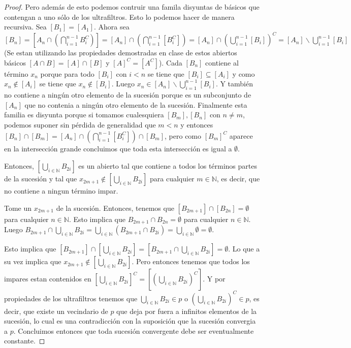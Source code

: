 \documentclass[letter,twoside,12pt]{article}
\begin{document}
\begin{enumerate}
\begin{proof}
Pero además de esto podemos contruir una famila disyuntas de básicos que contengan a uno sólo de los ultrafiltros. Esto lo podemos hacer de manera recursiva. Sea $ [B_1] = [A_1] $. Ahora sea $ [B_n] = [A_n\cap(\bigcap_{i=1}^{n-1} B_{i}^C)] = [A_n]\cap(\bigcap_{i=1}^{n-1} [B_{i}^C]) = [A_n]\cap (\bigcup_{i=1}^{n-1} [B_{i}])^C = [A_n] \backslash \bigcup_{i=1}^{n-1} [ B_{i}]$ (Se estan utilizando las propiedades demostradas en clase de estos abiertos básicos $ [A \cap B]= [A]\cap[B] $ y $ [A]^C =[A^C]$). Cada $ [B_n] $ contiene al término $ x_n $ porque para todo $ [B_i] $ con $ i < n $ se tiene que $ [B_i]\subseteq [A_i] $ y como $ x_n \not \in [A_i] $ se tiene que $ x_n \not  \in [B_i] $. Luego $ x_n \in [A_n] \backslash \bigcup_{i=1}^{n-1} [ B_{i}] $. Y también no contiene a ningún otro elemento de la sucesión porque es un subconjunto de $ [A_n] $ que no contenia a ningún otro elemento de la sucesión. Finalmente esta familia es disyunta porque si tomamos cualesquiera $ [B_m], [B_n] $ con $ n \not = m $, podemos suponer sin pérdida de generalidad que $ m < n $ y entonces $ [B_n] \cap [B_m]=[A_n]\cap (\bigcap_{i=1}^{n-1} [B_{i}^C]) \cap [B_m] $, pero como $ [B_m]^C $ aparece en la intersección grande concluimos que toda esta intersección es igual a $ \emptyset $. 

Entonces, $ [\bigcup_{i \in \mathbb{N}} B_{2i}] $ es un abierto tal que contiene a todos los términos partes de la sucesión y tal que $ x_{2m+1} \not \in [\bigcup_{i \in \mathbb{N}} B_{2i}] $ para cualquier $ m \in \mathbb{N} $, es decir, que no contiene a ningun término impar.

Tome un $ x_{2m+1} $ de la sucesión. Entonces, tenemos que $ [B_{2m+1}] \cap [B_{2n}] = \emptyset $ para cualquier $ n \in \mathbb{N} $. Esto implica que $ B_{2m+1}\cap B_{2n} = \emptyset $  para cualquier $ n \in \mathbb{N} $. Luego $ B_{2m+1}\cap \bigcup_{i \in \mathbb{N}} B_{2i} = \bigcup_{i \in \mathbb{N}} (B_{2m+1}\cap B_{2i}) = \bigcup_{i \in \mathbb{N}} \emptyset = \emptyset  $.

Esto implica que $ [B_{2m+1}] \cap [\bigcup_{i \in \mathbb{N}} B_{2i}] = [B_{2m+1} \cap \bigcup_{i \in \mathbb{N}} B_{2i}] = \emptyset $. Lo que a su vez implica que $ x_{2m+1} \not \in [\bigcup_{i \in \mathbb{N}} B_{2i}] $. Pero entonces tenemos que todos los impares estan contenidos en $ [\bigcup_{i \in \mathbb{N}} B_{2i}]^C = [(\bigcup_{i \in \mathbb{N}} B_{2i})^C] $. Y por propiedades de los ultrafiltros tenemos que $ \bigcup_{i \in \mathbb{N}} B_{2i} \in p $ o $ (\bigcup_{i \in \mathbb{N}} B_{2i})^C \in p $, es decir, que existe un vecindario de $ p $ que deja por fuera a infinitos elementos de la sucesión, lo cual es una contradicción con la suposición que la sucesión convergia a $ p $. Concluimos entonces que toda sucesión convergente debe ser eventualmente constante.
\end{proof}


\end{enumerate}
\end{document}

